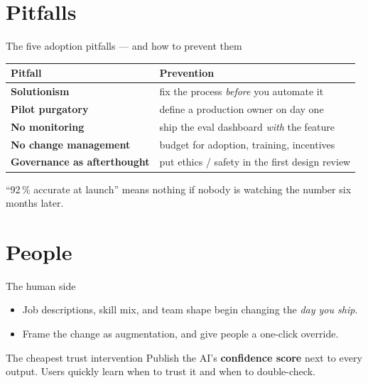 \documentclass[aspectratio=169,11pt]{beamer}
\begin{document}
\section{Pitfalls}
\begin{frame}{The five adoption pitfalls --- and how to prevent them}
  \small
  \begin{center}
  \begin{tabular}{lp{6.4cm}}
    \toprule
    \textbf{Pitfall} & \textbf{Prevention} \\
    \midrule
    \textcolor{cred}{\textbf{Solutionism}}        & fix the process \emph{before} you automate it \\
    \textcolor{cred}{\textbf{Pilot purgatory}}    & define a production owner on day one \\
    \textcolor{cred}{\textbf{No monitoring}}       & ship the eval dashboard \emph{with} the feature \\
    \textcolor{cred}{\textbf{No change management}}& budget for adoption, training, incentives \\
    \textcolor{cred}{\textbf{Governance as afterthought}} & put ethics / safety in the first design review \\
    \bottomrule
  \end{tabular}
  \end{center}
  \vspace{2pt}
  {\footnotesize ``92\,\% accurate at launch'' means nothing if nobody is watching the number six months later.}
\end{frame}

\section{People}
\begin{frame}{The human side}
  \begin{itemize}
    \item Job descriptions, skill mix, and team shape begin changing the \emph{day you ship}.
    \item Frame the change as augmentation, and give people a one-click override.
  \end{itemize}
  \begin{block}{The cheapest trust intervention}
    Publish the AI's \textbf{confidence score} next to every output. Users quickly learn when to trust it and when to double-check.
  \end{block}
\end{frame}
\end{document}
